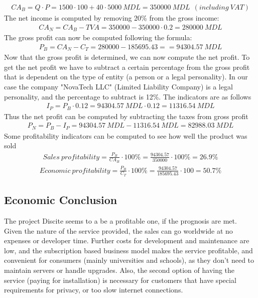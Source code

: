 \begin{eqnarray}
CA_{B} = Q \cdot P = 1500 \cdot 100 + 40 \cdot 5000~MDL = 350000~MDL ~~(including~VAT)
\end{eqnarray}
The net income is computed by removing 20\% from the gross income:
\begin{eqnarray}
CA_{N} = CA_{B} - TVA = 350000 - 350000 \cdot 0.2 = 280000~MDL
\end{eqnarray}
The gross profit can now be computed following the formula:
\begin{eqnarray}
P_{B} = CA_{N} - C_{T} = 280000 - 185695.43 =  = 94304.57~MDL
\end{eqnarray}
Now that the gross profit is determined, we can now compute the net profit. To get the net profit we
have to subtract a certain percentage from the gross profit that is dependent on the type of entity (a person or a legal personality). In our case the company "NovaTech LLC" (Limited Liability Company) is a legal personality, and the percentage to subtract is 12\%. The indicators are as follows
\begin{eqnarray}
 I_{P} = P_{B} \cdot 0.12 = 94304.57~MDL \cdot 0.12 = 11316.54~MDL
\end{eqnarray}
Thus the net profit can be computed by subtracting the taxes from gross profit
\begin{eqnarray}
P_{N} = P_{B} - I_{P} = 94304.57~MDL - 11316.54~MDL = 82988.03~MDL
\end{eqnarray}
Some profitability indicators can be computed to see how well the product was sold
\begin{eqnarray}
Sales~ profitability = \frac{P_{B}}{CA_{B}} \cdot 100\% = \frac{94304.57}{350000} \cdot 100\% = 26.9\%
\end{eqnarray}
\begin{eqnarray}
Economic~profitability = \frac{P_{B}}{C_{T}} \cdot 100\% = \frac{94304.57}{185695.43} \cdot 100 = 50.7\%
\end{eqnarray}


\subsection{Economic Conclusion}
The project Discite seems to a be a profitable one, if the prognosis are met.
Given  the nature of the service provided, the sales can go worldwide at no
expenses or developer time. Further costs for development and maintenance are
low, and the subscription based business model makes the service profitable, and
convenient for consumers (mainly universities and schools), as they don't need
to maintain servers or handle upgrades. Also, the second option of having the
service (paying for installation) is necessary for customers that have special
requirements for privacy, or too slow internet connections.

\clearpage
